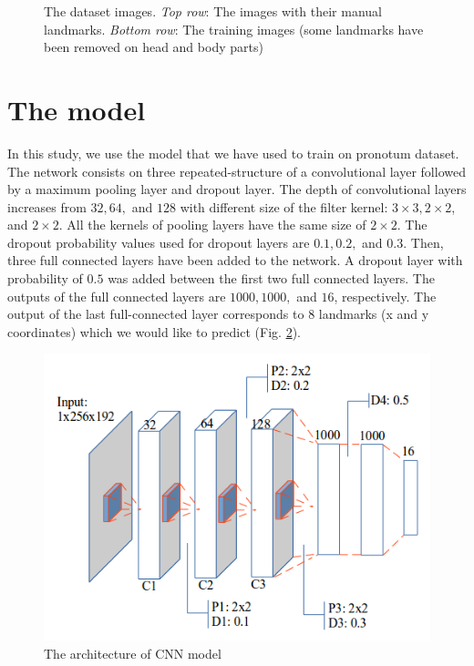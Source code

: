 \documentclass[12pt,a4paper]{article}
\begin{document}
\begin{figure}[h!]
\caption{The dataset images. \textit{Top row}: The images with their manual landmarks. \textit{Bottom row}: The training images (some landmarks have been removed on head and body parts)}
\label{figdata}
\end{figure}
\section{The model}
In this study, we use the model that we have used to train on pronotum dataset. 
The network consists on three repeated-structure of a convolutional layer followed by a maximum pooling layer and dropout layer. The depth
of convolutional layers increases from $32, 64,$ and $128$ with
different size of the filter kernel: $3 \times 3, 2 \times 2$, and $2 \times 2$.
All the kernels of pooling layers have the same size of $2 \times 2$. The dropout probability values used for dropout layers are $0.1, 0.2,$ and $0.3$.
Then, three full connected layers have been added to the
network. A dropout layer with probability of $0.5$ was added between the first two full connected layers. The outputs of the full connected layers are $1000, 1000,$
and $16$, respectively. The output of the last full-connected
layer corresponds to $8$ landmarks (x and y coordinates) which
we would like to predict (Fig. \ref{1Econv}). 
\begin{figure}[h!]
	\centering
	\includegraphics[scale=0.45]{images/architecture3}
	\caption{The architecture of CNN model}
	\label{1Econv}
\end{figure}\\
\end{document}
